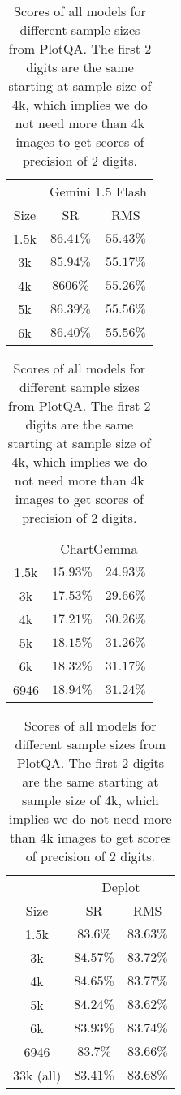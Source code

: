 \begin{table}
 \begin{tabular}{|c|c|c|}
     & \multicolumn{2}{|c|}{Gemini 1.5 Flash} \\
     Size  & SR & RMS \\
     1.5k & $86.41\%$ & $55.43\%$ \\
     3k & $85.94\%$ &  $55.17\%$  \\
     4k & $8606\%$ & $55.26\%$  \\
     5k & $86.39\%$ & $55.56\%$ \\
     6k & $86.40\%$ & $55.56\%$ \\
 \end{tabular}
    \begin{tabular}{|c|c|c|}
        & \multicolumn{2}{|c|}{ChartGemma} \\
        1.5k & $15.93\%$ &  $24.93\%$ \\
        3k & $17.53\%$ &  $29.66\%$ \\
        4k & $17.21\%$ &   $30.26\%$ \\
        5k & $18.15\%$ &  $31.26\%$ \\
        6k & $18.32\%$ & $31.17\%$ \\
        6946 & $18.94\%$ &  $31.24\%$ \\
    \end{tabular}
    \begin{tabular}{|c|c|c|}
        & \multicolumn{2}{|c|}{Deplot} \\
     Size  & SR & RMS \\
        1.5k & $83.6\%$ & $83.63\%$ \\
        3k & $84.57\%$ & $83.72\%$ \\
        4k & $84.65\%$ & $83.77\%$ \\
        5k & $84.24\%$ & $83.62\%$ \\
        6k & $83.93\%$ & $83.74\%$ \\
        6946 & $83.7\%$ & $83.66\%$ \\
        33k (all) &  $83.41\%$ & $83.68\%$ \\
    \end{tabular}
 \caption{Scores of all models for different sample sizes from PlotQA.
    The first 2 digits are the same starting at sample size of 4k, which implies we do not need more than 4k images to get scores of precision of 2 digits.}
 \label{tab:plotqa-scores-for-various-sizes}
  \end{table}
